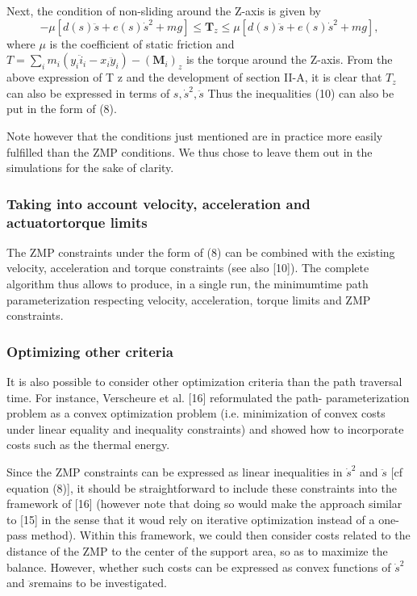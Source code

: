 \documentclass[journal]{IEEEtran}
\begin{document}
Next, the condition of non-sliding around the Z-axis is
given by
\begin{equation}
-\mu[d(s)\ddot{s}+e(s)\dot{s}^{2}+mg]\leq \textbf{T}_{z}\leq \mu[d(s)\ddot{s}+e(s)\dot{s}^{2}+mg],
\end{equation}
where $\mu$ is the coefficient of static friction and $T=\sum_{i}m_{i}(y_{i}\ddot{i}_{i}-x_{i}\ddot{y}_{i})-(\textbf{M}_{i})_{z}$ is the torque around the Z-axis. From the above expression of T z and the development
of section II-A, it is clear that $T_{z}$ can also be expressed in
terms of $s,\dot{s}^{2},\ddot{s}$ Thus the inequalities (10) can also be put
in the form of (8).

Note however that the conditions just mentioned are in
practice more easily fulfilled than the ZMP conditions. We
thus chose to leave them out in the simulations for the sake of clarity.

\subsubsection{Taking into account velocity, acceleration and actuatortorque limits}
The ZMP constraints under the form of (8)
can be combined with the existing velocity, acceleration and torque constraints (see also [10]). The complete algorithm thus allows to produce, in a single run, the minimumtime path parameterization respecting velocity, acceleration, torque limits and ZMP constraints.

\subsubsection{Optimizing other criteria}
It is also possible to consider other optimization criteria than the path traversal time. For instance, Verscheure et al. [16] reformulated the path-
parameterization problem as a convex optimization problem
(i.e. minimization of convex costs under linear equality and inequality constraints) and showed how to incorporate costs such as the thermal energy.

Since the ZMP constraints can be expressed as linear
inequalities in $\dot{s}^{2}$ and $\ddot{s}$ [cf equation (8)], it should be
straightforward to include these constraints into the framework of [16] (however note that doing so would make the
approach similar to [15] in the sense that it woud rely on
iterative optimization instead of a one-pass method). Within
this framework, we could then consider costs related to the
distance of the ZMP to the center of the support area, so as
to maximize the balance. However, whether such costs can
be expressed as convex functions of $\dot{s}^{2}$ and $\ddot{s}$remains to be investigated.
\end{document}
